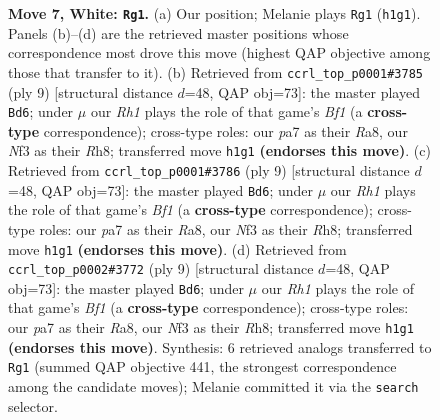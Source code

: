 \documentclass[11pt]{article}
\begin{document}
\begin{figure}[p]
\caption{\textbf{Move 7, White: \texttt{Rg1}.} (a) Our position; Melanie plays \texttt{Rg1} (\texttt{h1g1}). Panels (b)--(d) are the retrieved master positions whose correspondence most drove this move (highest QAP objective among those that transfer to it). (b) Retrieved from \texttt{ccrl\_top\_p0001\#3785} (ply 9) [structural distance $d$=48, QAP obj=73]: the master played \texttt{Bd6}; under $\mu$ our \emph{Rh1} plays the role of that game's \emph{Bf1} (a \textbf{cross-type} correspondence); cross-type roles: our \emph{p}a7 as their \emph{R}a8, our \emph{N}f3 as their \emph{R}h8; transferred move \texttt{h1g1} \textbf{(endorses this move)}. (c) Retrieved from \texttt{ccrl\_top\_p0001\#3786} (ply 9) [structural distance $d$=48, QAP obj=73]: the master played \texttt{Bd6}; under $\mu$ our \emph{Rh1} plays the role of that game's \emph{Bf1} (a \textbf{cross-type} correspondence); cross-type roles: our \emph{p}a7 as their \emph{R}a8, our \emph{N}f3 as their \emph{R}h8; transferred move \texttt{h1g1} \textbf{(endorses this move)}. (d) Retrieved from \texttt{ccrl\_top\_p0002\#3772} (ply 9) [structural distance $d$=48, QAP obj=73]: the master played \texttt{Bd6}; under $\mu$ our \emph{Rh1} plays the role of that game's \emph{Bf1} (a \textbf{cross-type} correspondence); cross-type roles: our \emph{p}a7 as their \emph{R}a8, our \emph{N}f3 as their \emph{R}h8; transferred move \texttt{h1g1} \textbf{(endorses this move)}. Synthesis: 6 retrieved analogs transferred to \texttt{Rg1} (summed QAP objective 441, the strongest correspondence among the candidate moves); Melanie committed it via the \texttt{search} selector.}
\label{fig:thought-m12}
\end{figure}

\clearpage
\end{document}
